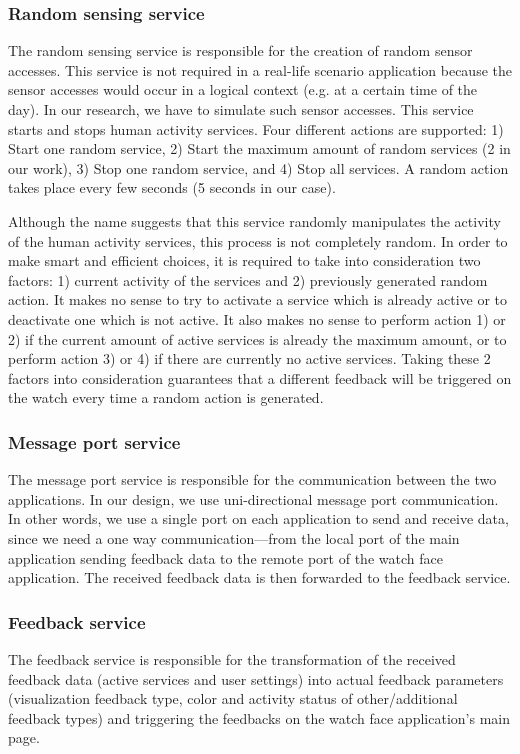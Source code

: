 \documentclass[conference, a4paper, 10pt, twocolumn]{IEEEtran}
\begin{document}
\subsubsection{Random sensing service}
The random sensing service is responsible for the creation of random sensor accesses. This service is not required in a real-life scenario application because the sensor accesses would occur in a logical context (e.g. at a certain time of the day). In our research, we have to simulate such sensor accesses. This service starts and stops human activity services. Four different actions are supported: 1) Start one random service, 2) Start the maximum amount of random services (2 in our work), 3) Stop one random service, and 4) Stop all services. A random action takes place every few seconds (5 seconds in our case).

Although the name suggests that this service randomly manipulates the activity of the human activity services, this process is not completely random. In order to make smart and efficient choices, it is required to take into consideration two factors: 1) current activity of the services and 2) previously generated random action. It makes no sense to try to activate a service which is already active or to deactivate one which is not active. It also makes no sense to perform action 1) or 2) if the current amount of active services is already the maximum amount, or to perform action 3) or 4) if there are currently no active services. Taking these 2 factors into consideration guarantees that a different feedback will be triggered on the watch every time a random action is generated.

\subsubsection{Message port service}
The message port service is responsible for the communication between the two applications. In our design, we use uni-directional message port communication. In other words, we use a single port on each application to send and receive data, since we need a one way communication---from the local port of the main application sending feedback data to the remote port of the watch face application. The received feedback data is then forwarded to the feedback service.

\subsubsection{Feedback service}
The feedback service is responsible for the transformation of the received feedback data (active services and user settings) into actual feedback parameters (visualization feedback type, color and activity status of other/additional feedback types) and triggering the feedbacks on the watch face application's main page. 
\end{document}
